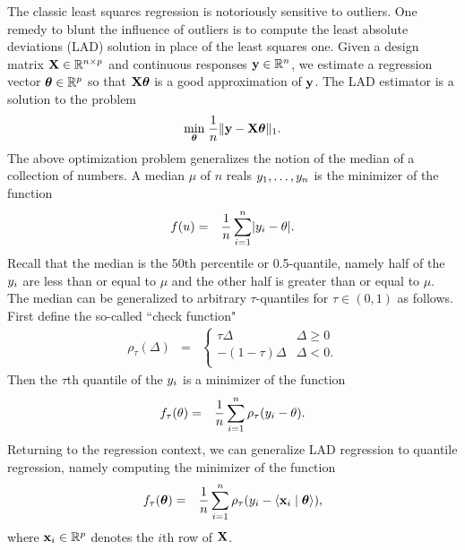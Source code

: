 \documentclass{article}
\newcommand{\Real}{\mathbb{R}}
\newcommand{\V}[1]{{\bm{\mathbf{\MakeLowercase{#1}}}}} %
\newcommand{\VE}[2]{\MakeLowercase{#1}_{#2}} %
\newcommand{\M}[1]{{\bm{\mathbf{\MakeUppercase{#1}}}}} %
\begin{document}
The classic least squares regression is notoriously sensitive to outliers. One remedy to blunt the influence of outliers is to compute the least absolute deviations (LAD) solution in place of the least squares one. Given a design matrix $\M{X} \in \Real^{n \times p}$ and continuous responses $\V{y} \in \Real^n$, we estimate a regression vector $\V{\theta} \in \Real^p$ so that $\M{X}\V{\theta}$ is a good approximation of $\V{y}$. The LAD estimator is a solution to the problem
\begin{eqnarray*}
\underset{\V{\theta}}{\min}\; \frac{1}{n}\lVert \V{y} - \M{X}\V{\theta} \rVert_1.
\end{eqnarray*}
The above optimization problem generalizes the notion of the median of a collection of numbers. A median $\mu$ of $n$ reals $\VE{y}{1}, \ldots, \VE{y}{n}$ is the minimizer of the function
\begin{eqnarray*}
f(u) & = & \frac{1}{n}\sum_{i=1}^n \lvert \VE{y}{i} - \theta \rvert.
\end{eqnarray*}
Recall that the median is the 50th percentile or 0.5-quantile, namely half of the $\VE{y}{i}$ are less than or equal to $\mu$ and the other half is greater than or equal to $\mu$. The median can be generalized to arbitrary $\tau$-quantiles for $\tau \in (0,1)$ as follows. First define the so-called ``check function"
\begin{eqnarray*}
\rho_\tau(\Delta) & = & \begin{cases}
\tau \Delta & \text{$\Delta \geq 0$} \\
-(1-\tau)\Delta & \text{$\Delta < 0$}. \\
\end{cases}
\end{eqnarray*}
Then the $\tau$th quantile of the $\VE{y}{i}$ is a minimizer of the function
\begin{eqnarray*}
f_\tau(\theta) & = & \frac{1}{n}\sum_{i=1}^n \rho_\tau(\VE{y}{i} - \theta).
\end{eqnarray*}
Returning to the regression context, we can generalize LAD regression to quantile regression, namely computing the minimizer of the function
\begin{eqnarray*}
f_\tau(\V{\theta}) & = & \frac{1}{n}\sum_{i=1}^n \rho_\tau(\VE{y}{i} - \langle \V{x}_i \mid \V{\theta} \rangle),
\end{eqnarray*}
where $\V{x}_i \in \Real^p$ denotes the $i$th row of $\M{X}$.

\end{document}
